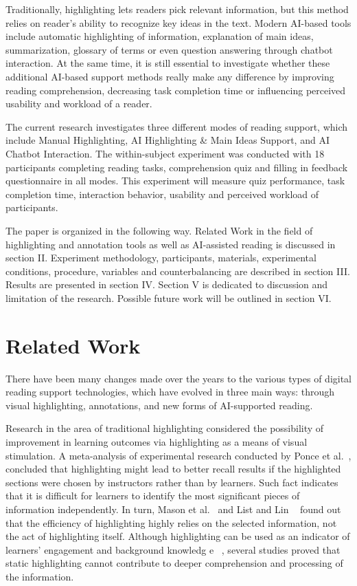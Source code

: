 \documentclass{IEEEtran}
\begin{document}
Traditionally, highlighting lets readers pick relevant information, but this method relies on reader’s ability to recognize key ideas in the text. Modern AI-based tools include automatic highlighting of information, explanation of main ideas, summarization, glossary of terms or even question answering through chatbot interaction. At the same time, it is still essential to investigate whether these additional AI-based support methods really make any difference by improving reading comprehension, decreasing task completion time or influencing perceived usability and workload of a reader.

The current research investigates three different modes of reading support, which include Manual Highlighting, AI Highlighting & Main Ideas Support, and AI Chatbot Interaction. The within-subject experiment was conducted with 18 participants completing reading tasks, comprehension quiz and filling in feedback questionnaire in all modes. This experiment will measure quiz performance, task completion time, interaction behavior, usability and perceived workload of participants.

The paper is organized in the following way. Related Work in the field of highlighting and annotation tools as well as AI-assisted reading is discussed in section II. Experiment methodology, participants, materials, experimental conditions, procedure, variables and counterbalancing are described in section III. Results are presented in section IV. Section V is dedicated to discussion and limitation of the research. Possible future work will be outlined in section VI.


\section{Related Work}

There have been many changes made over the years to the various types of digital reading support technologies, which have evolved in three main ways: through visual highlighting, annotations, and new forms of AI-supported reading.

Research in the area of traditional highlighting considered the possibility of improvement in learning outcomes via highlighting as a means of visual stimulation. A meta-analysis of experimental research conducted by Ponce et al.~\cite{ponce2022}, concluded that highlighting might lead to better recall results if the highlighted sections were chosen by instructors rather than by learners. Such fact indicates that it is difficult for learners to identify the most significant pieces of information independently. In turn, Mason et al.~\cite{mason2024} and List and Lin ~\cite{list2023} found out that the efficiency of highlighting highly relies on the selected information, not the act of highlighting itself. Although highlighting can be used as an indicator of learners' engagement and background knowledg e ~\cite{winchell2020}, several studies proved that static highlighting cannot contribute to deeper comprehension and processing of the information.
\end{document}
